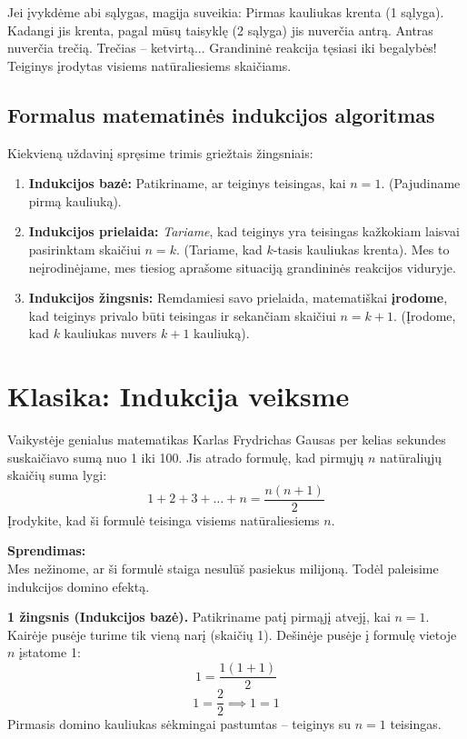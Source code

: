 \documentclass[11pt,a4paper]{scrartcl}
\begin{document}
Jei įvykdėme abi sąlygas, magija suveikia: Pirmas kauliukas krenta (1 sąlyga). Kadangi jis krenta, pagal mūsų taisyklę (2 sąlyga) jis nuverčia antrą. Antras nuverčia trečią. Trečias – ketvirtą... Grandininė reakcija tęsiasi iki begalybės! Teiginys įrodytas visiems natūraliesiems skaičiams.

\subsection*{Formalus matematinės indukcijos algoritmas}

Kiekvieną uždavinį spręsime trimis griežtais žingsniais:
\begin{enumerate}
    \item \textbf{Indukcijos bazė:} Patikriname, ar teiginys teisingas, kai $n = 1$. (Pajudiname pirmą kauliuką).
    \item \textbf{Indukcijos prielaida:} \textit{Tariame}, kad teiginys yra teisingas kažkokiam laisvai pasirinktam skaičiui $n = k$. (Tariame, kad $k$-tasis kauliukas krenta). Mes to neįrodinėjame, mes tiesiog aprašome situaciją grandininės reakcijos viduryje.
    \item \textbf{Indukcijos žingsnis:} Remdamiesi savo prielaida, matematiškai \textbf{įrodome}, kad teiginys privalo būti teisingas ir sekančiam skaičiui $n = k+1$. (Įrodome, kad $k$ kauliukas nuvers $k+1$ kauliuką).
\end{enumerate}

\section{Klasika: Indukcija veiksme}

\begin{example}
Vaikystėje genialus matematikas Karlas Frydrichas Gausas per kelias sekundes suskaičiavo sumą nuo 1 iki 100. Jis atrado formulę, kad pirmųjų $n$ natūraliųjų skaičių suma lygi:
$$ 1 + 2 + 3 + \dots + n = \frac{n(n+1)}{2} $$
Įrodykite, kad ši formulė teisinga visiems natūraliesiems $n$.
\end{example}

\textbf{Sprendimas:}\\
Mes nežinome, ar ši formulė staiga nesulūš pasiekus milijoną. Todėl paleisime indukcijos domino efektą.

\textbf{1 žingsnis (Indukcijos bazė).} Patikriname patį pirmąjį atvejį, kai $n = 1$. Kairėje pusėje turime tik vieną narį (skaičių 1). Dešinėje pusėje į formulę vietoje $n$ įstatome 1:
$$
1 = \frac{1(1+1)}{2}
$$
$$
1 = \frac{2}{2} \implies 1 = 1
$$
Pirmasis domino kauliukas sėkmingai pastumtas – teiginys su $n=1$ teisingas.
\end{document}
